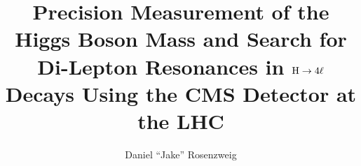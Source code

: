 \documentclass{ufdissertation}\sloppy
\title{Precision Measurement of the Higgs Boson Mass and Search for Di-Lepton Resonances in ${\rm H \rightarrow 4\ell}$ Decays Using the CMS Detector at the LHC}
\author{Daniel ``Jake'' Rosenzweig}%
\begin{document}
% 


\justify %



% 

% 

% 

% 
% 
% 
% 
% 

% 
% 
% 
% 
% 
% 
% 
% 


%  
\end{document}

